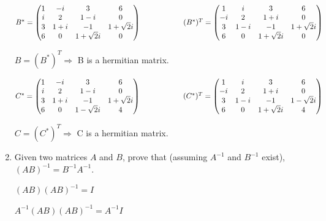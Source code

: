 \documentclass[fleqn]{article}
\begin{document}
\begin{enumerate}
      \bigbreak

      \textcolor{hwColor}{
        $
        B^*=\begin{pmatrix}
          1 & -i & 3 & 6 \\
          i & 2 & 1-i  & 0 \\
          3 & 1+i & -1 & 1+\sqrt{2}i \\
          6 & 0 & 1+\sqrt{2}i & 0 \\
        \end{pmatrix}
        \hskip 2truecm
        (B^*)^T=\begin{pmatrix}
          1 & i & 3 & 6 \\
          -i & 2 & 1+i & 0 \\
          3 & 1-i & -1 & 1+\sqrt{2}i \\
          6 & 0 & 1+\sqrt{2}i & 0
        \end{pmatrix}
        $
      }

      \textcolor{hwColor}{$B=(B^*)^T\Longrightarrow$ B is a hermitian matrix.}

      \bigbreak

      \textcolor{hwColor}{
        $
        C^*=\begin{pmatrix}
          1 & -i & 3 & 6 \\
          i & 2 & 1-i & 0 \\
          3 & 1+i & -1 & 1+\sqrt{2}i \\
          6 & 0 & 1-\sqrt{2}i & 4 \\
        \end{pmatrix}
        \hskip 2truecm
        (C^*)^T=\begin{pmatrix}
          1 & i & 3 & 6 \\
          -i & 2 & 1+i & 0 \\
          3 & 1-i & -1 & 1-\sqrt{2}i \\
          6 & 0 & 1+\sqrt{2}i & 4
        \end{pmatrix}
        $
      }

      \textcolor{hwColor}{$C=(C^*)^T\Longrightarrow$ C is a hermitian matrix.}


    \item  Given two matrices $A$ and $B$,  prove that (assuming $A^{-1}$ and $B^{-1}$ exist),
    $(AB)^{-1} = B^{-1}A^{-1} $.  

    \textcolor{hwColor}{$(AB)(AB)^{-1}=I$}

    \textcolor{hwColor}{$A^{-1}(AB)(AB)^{-1}=A^{-1}I$}


\end{enumerate}
\end{document}
